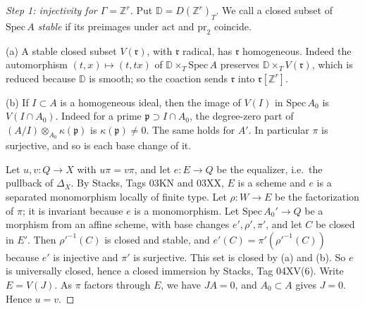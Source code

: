 \begin{proof}[Step 1: injectivity for $\Gamma=\mathbb{Z}^r$]
Put $\mathbb{D}=D(\mathbb{Z}^r)_T$. We call a closed subset of $\mathrm{Spec}\,A$ \emph{stable} if its preimages under $\mathrm{act}$ and $\mathrm{pr}_2$ coincide.

(a) A stable closed subset $V(\mathfrak{r})$, with $\mathfrak{r}$ radical, has $\mathfrak{r}$ homogeneous. Indeed the automorphism $(t,x)\mapsto(t,tx)$ of $\mathbb{D}\times_T\mathrm{Spec}\,A$ preserves $\mathbb{D}\times_T V(\mathfrak{r})$, which is reduced because $\mathbb{D}$ is smooth; so the coaction sends $\mathfrak{r}$ into $\mathfrak{r}[\mathbb{Z}^r]$.

(b) If $I\subset A$ is a homogeneous ideal, then the image of $V(I)$ in $\mathrm{Spec}\,A_0$ is $V(I\cap A_0)$. Indeed for a prime $\mathfrak{p}\supset I\cap A_0$, the degree-zero part of $(A/I)\otimes_{A_0}\kappa(\mathfrak{p})$ is $\kappa(\mathfrak{p})\neq0$. The same holds for $A'$. In particular $\pi$ is surjective, and so is each base change of it.

Let $u,v\colon Q\to X$ with $u\pi=v\pi$, and let $e\colon E\to Q$ be the equalizer, i.e.\ the pullback of $\Delta_X$. By Stacks, Tags 03KN and 03XX, $E$ is a scheme and $e$ is a separated monomorphism locally of finite type. Let $\rho\colon W\to E$ be the factorization of $\pi$; it is invariant because $e$ is a monomorphism. Let $\mathrm{Spec}\,A_0'\to Q$ be a morphism from an affine scheme, with base changes $e',\rho',\pi'$, and let $C$ be closed in $E'$. Then $\rho'^{-1}(C)$ is closed and stable, and $e'(C)=\pi'(\rho'^{-1}(C))$ because $e'$ is injective and $\pi'$ is surjective. This set is closed by (a) and (b). So $e$ is universally closed, hence a closed immersion by Stacks, Tag 04XV(6). Write $E=V(J)$. As $\pi$ factors through $E$, we have $JA=0$, and $A_0\subset A$ gives $J=0$. Hence $u=v$.
\end{proof}

